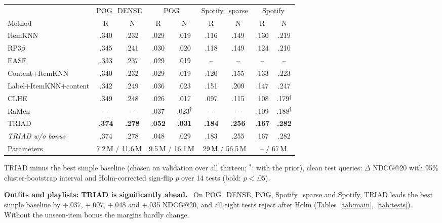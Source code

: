 \documentclass[runningheads]{llncs}
\renewcommand{\paragraph}[1]{\smallskip\noindent\textbf{#1}\ }
\begin{document}
\begin{table}[t]
\medskip
\begin{tabular}{lcccccccc}
\toprule
 & \multicolumn{2}{c}{POG\_DENSE} & \multicolumn{2}{c}{POG} & \multicolumn{2}{c}{Spotify\_sparse} & \multicolumn{2}{c}{Spotify}\\
\cmidrule(lr){2-3}\cmidrule(lr){4-5}\cmidrule(lr){6-7}\cmidrule(lr){8-9}
Method & R & N & R & N & R & N & R & N\\
\midrule
ItemKNN & .340 & .232 & .029 & .019 & .116 & .149 & .130 & .219\\
RP3$\beta$ & .345 & .241 & .030 & .020 & .118 & .149 & .124 & .210\\
EASE & .333 & .237 & .029 & .019 & -- & -- & -- & --\\
Content+ItemKNN & .340 & .232 & .029 & .019 & .120 & .155 & .133 & .223\\
Label+ItemKNN+content & .342 & .249 & .036 & .023 & .151 & .209 & .147 & .247\\
\midrule
CLHE & .349 & .248 & .026 & .017 & .097 & .115 & .108 & .179$^\ddagger$\\
RaMen & -- & -- & .037 & .023$^\dagger$ & -- & -- & .109 & .188$^\dagger$\\
\midrule
TRIAD & \textbf{.374} & \textbf{.278} & \textbf{.052} & \textbf{.031} & \textbf{.184} & \textbf{.256} & \textbf{.167} & \textbf{.282}\\
\emph{TRIAD w/o bonus} & .374 & .278 & .048 & .029 & .183 & .255 & .167 & .282\\
\midrule
Parameters & \multicolumn{2}{c}{7.2\,M / 11.6\,M} & \multicolumn{2}{c}{9.5\,M / 16.1\,M} & \multicolumn{2}{c}{29\,M / 56.5\,M} & \multicolumn{2}{c}{-- / 67\,M}\\
\bottomrule
\end{tabular}
\end{table}

\begin{table}[t]
\centering
\caption{TRIAD minus the best simple baseline (chosen on validation over all thirteen; $^{*}$: with the prior), clean
test queries: $\Delta$ NDCG@20 with 95\% cluster-bootstrap interval and Holm-corrected sign-flip $p$ over 14 tests
(bold: $p<.05$).}
\label{tab:tests}
\setlength{\tabcolsep}{1.6pt}
\scriptsize

\end{table}

\paragraph{Outfits and playlists: TRIAD is significantly ahead.} On POG\_DENSE, POG, Spotify\_sparse and Spotify, TRIAD
leads the best simple baseline by +.037, +.007, +.048 and +.035 NDCG@20, and all eight tests reject after Holm
(Tables~\ref{tab:main},~\ref{tab:tests}). Without the unseen-item bonus the margins hardly change.
\end{document}
